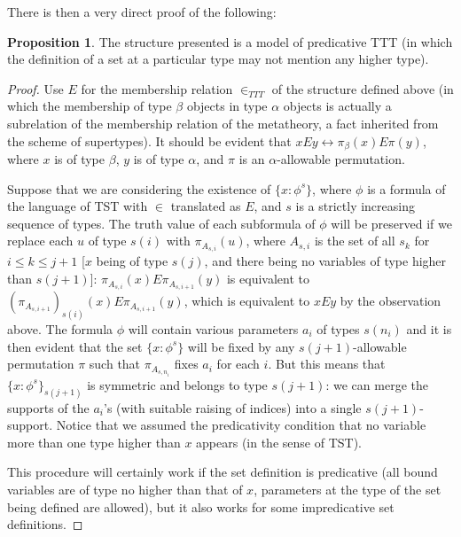 \documentclass[112pt]{article}
\theoremstyle{definition}
\newtheorem{proposition}[theorem]{Proposition}
\theoremstyle{remark}
\newcommand{\rk}[1]{{\color{blue}\sl #1}}
\newcommand{\suggest}[1]{{\color{red} #1}}
\newcommand{\hsuggest}[1]{{\color{magenta}#1}}
\begin{document}
{There is then a very direct proof of the following:}
\begin{proposition}\label{prop:predicative_ttt}
  The structure presented is a model of predicative TTT (in which the definition of a set at a particular type may not mention any higher type).
\end{proposition}
\begin{proof}
Use $E$ for the membership relation $\in_{TTT}$ of the structure defined above (in which the membership of type $\beta$ objects in type $\alpha$ objects is actually a subrelation of the membership relation of the metatheory, a fact inherited from the scheme of supertypes).  It should be evident that $x E y \leftrightarrow \pi_\beta(x) E \pi(y)$,
where $x$ is of type $\beta$, $y$ is of type $\alpha$, and $\pi$ is an $\alpha$-allowable permutation.

Suppose that we are considering the existence of $\{x : \phi^s\}$, where $\phi$ is a formula of the language of TST with $\in$ translated as $E$, and $s$ is a strictly increasing sequence of types.  The truth value of each subformula of $\phi$ will be preserved if we replace each $u$ of type $s(i)$ with $\pi_{A_{s,i}}(u)$, where  $A_{s,i}$ is the set of all $s_k$ for $i \leq k \leq j+1$ [$x$ being of type $s(j)$, and there being no variables of type higher than $s(j+1)$]:  $\pi_{A_{s,i}}(x) E  \pi_{A_{s,i+1}}(y)$ is equivalent to $(\pi_{A_{s,i+1}})_{s(i)}(x) E \pi_{A_{s,i+1}}(y)$, which is equivalent to $xEy$ by the observation above. The formula $\phi$ will contain various parameters $a_i$ of types $s(n_i)$ and it is then evident that the set $\{x : \phi^s\}$ will be fixed by any $s(j+1)$-allowable permutation $\pi$ such that $\pi_{A_{s,n_i}}$ fixes $a_i$ for each $i$.  But this means that
 $\{x : \phi^s\}_{s(j+1)}$ is symmetric and belongs to type $s(j+1)$: %
 we can merge the supports of the $a_i$'s (with suitable raising of indices) into a single $s(j+1)$-support.  Notice that we assumed the predicativity condition that no variable more than one type higher than $x$ appears (in the sense of TST).

This procedure will certainly work if the set definition is predicative (all bound variables are of type no higher than that of $x$, parameters at the type
of the set being defined are allowed), but it also works for some impredicative set definitions.
\end{proof}
\end{document}
